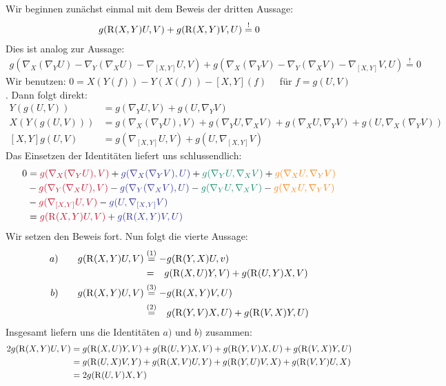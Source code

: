 \begin{bew}
Wir beginnen zunächst einmal mit dem Beweis der dritten Aussage:
\begin{align*}	
g(\operatorname{R}(X,Y)U,V)+g(\operatorname{R}(X,Y)V,U) \overset{!}{=} 0 
\end{align*}
Dies ist analog zur Aussage:
\begin{align*}
g(\nabla_X(\nabla_YU)-\nabla_Y(\nabla_XU)-\nabla_{[X,Y]}U,V) +g(\nabla_X(\nabla_YV)-\nabla_Y(\nabla_XV)-\nabla_{[X,Y]}V,U) \overset{!}{=} 0
\end{align*}
Wir benutzen: $0 = X(Y(f))-Y(X(f))-[X,Y](f)\quad$ für $f = g(U,V)$. \quad  Dann folgt direkt: 
\begin{align*}
Y(g(U,V)) &= g(\nabla_YU,V) + g(U,\nabla_YV)\\
X(Y(g(U,V))) &= g(\nabla_X(\nabla_YU),V) + g(\nabla_YU,\nabla_XV) + g(\nabla_XU,\nabla_YV) + g(U,\nabla_X(\nabla_YV)) \\
[X,Y]g(U,V) &= g(\nabla_{[X,Y]}U,V)+g(U,\nabla_{[X,Y]}V)
\end{align*}
Das Einsetzen der Identitäten liefert uns schlussendlich:
\begin{align*}
	0 &= \color{myred}{g(\nabla_X(\nabla_YU),V)} \normalcolor+ \color{Blue}{g(\nabla_X(\nabla_YV),U)} \normalcolor+ \color{PineGreen}{g(\nabla_YU,\nabla_XV)} \normalcolor+ \color{BurntOrange}{g(\nabla_XU,\nabla_YV)} \\ \normalcolor
	&- \color{myred}{g(\nabla_Y(\nabla_XU),V)} \normalcolor- \color{Blue}{g(\nabla_Y(\nabla_XV),U)} \normalcolor- \color{PineGreen}{g(\nabla_YU,\nabla_XV)} \normalcolor- \color{BurntOrange}{g(\nabla_XU,\nabla_YV)} \\ \normalcolor
	&- \color{myred}{g(\nabla_{[X,Y]}U,V)} \normalcolor- \color{Blue}{g(U,\nabla_{[X,Y]}V)} \\ \normalcolor
	&= \color{myred}{g(\curv(X,Y)U,V)} \normalcolor + \color{Blue}{g(\curv(X,Y)V,U)} 
\end{align*}
Wir setzen den Beweis fort. Nun folgt die vierte Aussage:
\begin{align*}
a) \qquad g(\operatorname{R}(X,Y)U,V) &\overset{\tiny{(1)}}{=} -g(\operatorname{R}(Y,X)U,v) \\
&= \phantom{-}g(\operatorname{R}(X,U)Y,V) + g(\operatorname{R}(U,Y)X,V) \\
b) \qquad g(\operatorname{R}(X,Y)U,V) &\overset{\tiny{(3)}}{=} -g(\operatorname{R}(X,Y)V,U) \\
&\overset{\tiny{(2)}}{=} \phantom{-}g(\operatorname{R}(Y,V)X,U) + g(\operatorname{R}(V,X)Y,U) 
\end{align*}
Insgesamt liefern uns die Identitäten $a)$ und $b)$ zusammen:
\begin{align*}
	2g(\operatorname{R}(X,Y)U,V) &= g(\operatorname{R}(X,U)Y,V) + g(\operatorname{R}(U,Y)X,V) + g(\operatorname{R}(Y,V)X,U) + g(\operatorname{R}(V,X)Y,U) \\
	&= g(\operatorname{R}(U,X)V,Y) + g(\operatorname{R}(X,V)U,Y) + g(\operatorname{R}(Y,U)V,X) + g(\operatorname{R}(V,Y)U,X) \\
	&= 2g(\operatorname{R}(U,V)X,Y)
\end{align*}
\end{bew}

